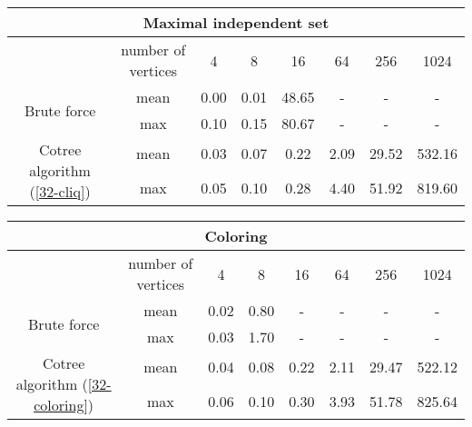 \begin{center}
    \begin{tabular}{|c|c|c|c|c|c|c|c|}
        \hline
        \multicolumn{8}{|c|}{Maximal independent set}                                                                        \\
        \hline
                                                          & number of vertices & 4    & 8    & 16    & 64   & 256   & 1024   \\
        \hline

        \multirow{2}{*}{Brute force}                      & mean               & 0.00 & 0.01 & 48.65 & -    & -     & -      \\
                                                          & max                & 0.10 & 0.15 & 80.67 & -    & -     & -      \\
        \hline
        \multirow{2}{*}{Cotree algorithm (\ref{32-cliq})} & mean               & 0.03 & 0.07 & 0.22  & 2.09 & 29.52 & 532.16 \\
                                                          & max                & 0.05 & 0.10 & 0.28  & 4.40 & 51.92 & 819.60 \\
        \hline
    \end{tabular}
\end{center}


\begin{center}
    \begin{tabular}{|c|c|c|c|c|c|c|c|}
        \hline
        \multicolumn{8}{|c|}{Coloring}                                                                                          \\
        \hline
                                                              & number of vertices & 4    & 8    & 16   & 64   & 256   & 1024   \\
        \hline

        \multirow{2}{*}{Brute force}                          & mean               & 0.02 & 0.80 & -    & -    & -     & -      \\
                                                              & max                & 0.03 & 1.70 & -    & -    & -     & -      \\
        \hline
        \multirow{2}{*}{Cotree algorithm (\ref{32-coloring})} & mean               & 0.04 & 0.08 & 0.22 & 2.11 & 29.47 & 522.12 \\
                                                              & max                & 0.06 & 0.10 & 0.30 & 3.93 & 51.78 & 825.64 \\
        \hline
    \end{tabular}
\end{center}

